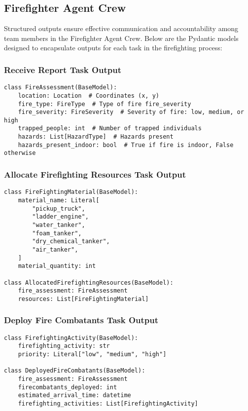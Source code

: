 \subsection{Firefighter Agent Crew}

Structured outputs ensure effective communication and accountability among team members in the Firefighter Agent Crew. Below are the Pydantic models designed to encapsulate outputs for each task in the firefighting process:

\subsubsection{Receive Report Task Output}
\begin{lstlisting}[caption={Pydantic model for Receive Report Task Output}]
class FireAssessment(BaseModel):
    location: Location  # Coordinates (x, y)
    fire_type: FireType  # Type of fire fire_severity
    fire_severity: FireSeverity  # Severity of fire: low, medium, or high
    trapped_people: int  # Number of trapped individuals
    hazards: List[HazardType]  # Hazards present
    hazards_present_indoor: bool  # True if fire is indoor, False otherwise
\end{lstlisting}


\subsubsection{Allocate Firefighting Resources Task Output}
\begin{lstlisting}[caption={Pydantic model for Allocate Firefighting Resources Task Output}]
class FireFightingMaterial(BaseModel):
    material_name: Literal[
        "pickup_truck",
        "ladder_engine",
        "water_tanker",
        "foam_tanker",
        "dry_chemical_tanker",
        "air_tanker",
    ]
    material_quantity: int

class AllocatedFirefightingResources(BaseModel):
    fire_assessment: FireAssessment
    resources: List[FireFightingMaterial]
\end{lstlisting}


\subsubsection{Deploy Fire Combatants Task Output}
\begin{lstlisting}[caption={Pydantic model for Deploy Fire Combatants Task Output}]
class FirefightingActivity(BaseModel):
    firefighting_activity: str
    priority: Literal["low", "medium", "high"]

class DeployedFireCombatants(BaseModel):
    fire_assessment: FireAssessment
    firecombatants_deployed: int
    estimated_arrival_time: datetime
    firefighting_activities: List[FirefightingActivity]
\end{lstlisting}


